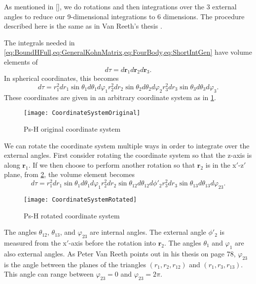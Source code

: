 \documentclass[Dissertation.tex]{subfiles}
\begin{document}
As mentioned in \cref{}, we do rotations and then integrations over the 3 
external angles to reduce our 9-dimensional integrations to 6 dimensions. The
procedure described here is the same as in Van Reeth's thesis
\cite{VanReethThesis}.

The integrals needed in
\cref{eq:BoundHFull,eq:GeneralKohnMatrix,eq:FourBody,eq:ShortIntGen} have
volume elements of
\begin{equation}
\label{eq:dTau1}
d\tau = d\textbf{r}_1 d\textbf{r}_2 d\textbf{r}_3.
\end{equation}
In spherical coordinates, this becomes
\begin{equation}
\label{eq:dTau2}
d\tau = r_1^2 dr_1 \sin\theta_1 d\theta_1 d\varphi_1 r_2^2 dr_2 \sin\theta_2
  d\theta_2 d\varphi_2 r_3^2 dr_3 \sin\theta_3 d\theta_3 d\varphi_3.
\end{equation}
These coordinates are given in an arbitrary coordinate system as in
\cref{fig:CoordinateSystemOriginal}.

\begin{figure}[H]
	\centering
	\texttt{[image: CoordinateSystemOriginal]}
	\caption{Ps-H original coordinate system}
	\label{fig:CoordinateSystemOriginal}
\end{figure}

We can rotate the coordinate system multiple ways in order to integrate over 
the external angles. First consider rotating the coordinate system so that the
z-axis is along $\textbf{r}_1$. If we then choose to perform another rotation
so that $\textbf{r}_2$ is in the x$'$-z$'$ plane, from
\cref{fig:CoordinateSystemRotated}, the volume element becomes
\begin{equation}
\label{eq:dTau3}
d\tau = r_1^2 dr_1 \sin\theta_1 d\theta_1 d\varphi_1 r_2^2 dr_2 \sin\theta_{12}
  d\theta_{12} d\phi'_2 r_3^2 dr_3 \sin\theta_{13} d\theta_{13} d\varphi_{23}.
\end{equation}
\begin{figure}[H]
	\centering
	\texttt{[image: CoordinateSystemRotated]}
	\caption{Ps-H rotated coordinate system}
	\label{fig:CoordinateSystemRotated}
\end{figure}
\noindent The angles $\theta_{12}$, $\theta_{13}$, and $\varphi_{23}$ are 
internal angles. The external angle $\phi'_2$ is measured from the x$'$-axis 
before the rotation into $\textbf{r}_2$. The angles $\theta_1$ and $\varphi_1$
are also external angles.
As Peter Van Reeth points out in his thesis \cite{VanReethThesis} on page 78, 
$\varphi_{23}$ is the angle between the planes of the triangles
$(r_1,r_2,r_{12})$ and $(r_1,r_3,r_{13})$. This angle can range between
$\varphi_{23} = 0$ and $\varphi_{23} = 2 \pi$.
\end{document}
